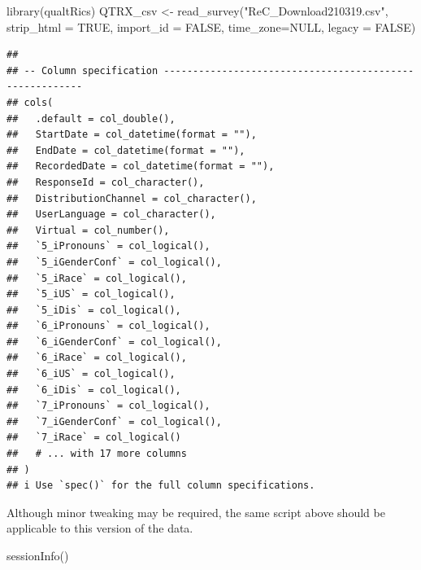 \documentclass[
  english,
]{book}
\newenvironment{Shaded}{\begin{snugshade}}{\end{snugshade}}
\newcommand{\AttributeTok}[1]{\textcolor[rgb]{0.77,0.63,0.00}{#1}}
\newcommand{\ConstantTok}[1]{\textcolor[rgb]{0.00,0.00,0.00}{#1}}
\newcommand{\FunctionTok}[1]{\textcolor[rgb]{0.00,0.00,0.00}{#1}}
\newcommand{\NormalTok}[1]{#1}
\newcommand{\OtherTok}[1]{\textcolor[rgb]{0.56,0.35,0.01}{#1}}
\newcommand{\StringTok}[1]{\textcolor[rgb]{0.31,0.60,0.02}{#1}}
\begin{document}
\begin{Shaded}
\begin{Highlighting}[]
\FunctionTok{library}\NormalTok{(qualtRics)}
\NormalTok{QTRX\_csv }\OtherTok{\textless{}{-}} \FunctionTok{read\_survey}\NormalTok{(}\StringTok{"ReC\_Download210319.csv"}\NormalTok{, }\AttributeTok{strip\_html =} \ConstantTok{TRUE}\NormalTok{, }\AttributeTok{import\_id =} \ConstantTok{FALSE}\NormalTok{, }\AttributeTok{time\_zone=}\ConstantTok{NULL}\NormalTok{, }\AttributeTok{legacy =} \ConstantTok{FALSE}\NormalTok{)}
\end{Highlighting}
\end{Shaded}

\begin{verbatim}
## 
## -- Column specification --------------------------------------------------------
## cols(
##   .default = col_double(),
##   StartDate = col_datetime(format = ""),
##   EndDate = col_datetime(format = ""),
##   RecordedDate = col_datetime(format = ""),
##   ResponseId = col_character(),
##   DistributionChannel = col_character(),
##   UserLanguage = col_character(),
##   Virtual = col_number(),
##   `5_iPronouns` = col_logical(),
##   `5_iGenderConf` = col_logical(),
##   `5_iRace` = col_logical(),
##   `5_iUS` = col_logical(),
##   `5_iDis` = col_logical(),
##   `6_iPronouns` = col_logical(),
##   `6_iGenderConf` = col_logical(),
##   `6_iRace` = col_logical(),
##   `6_iUS` = col_logical(),
##   `6_iDis` = col_logical(),
##   `7_iPronouns` = col_logical(),
##   `7_iGenderConf` = col_logical(),
##   `7_iRace` = col_logical()
##   # ... with 17 more columns
## )
## i Use `spec()` for the full column specifications.
\end{verbatim}

Although minor tweaking may be required, the same script above should be applicable to this version of the data.

\begin{Shaded}
\begin{Highlighting}[]
\FunctionTok{sessionInfo}\NormalTok{()}
\end{Highlighting}
\end{Shaded}
\end{document}
